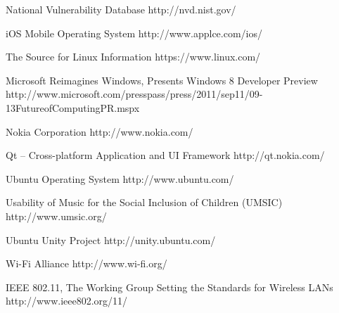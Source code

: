 \begin{thebibliography}{9}
		{National Vulnerability Database}
		{http://nvd.nist.gov/}
	
		{iOS Mobile Operating System}
		{http://www.applce.com/ios/}

		{The Source for Linux Information}
		{https://www.linux.com/}

		{Microsoft Reimagines Windows, Presents Windows 8 Developer Preview}
		{http://www.microsoft.com/presspass/press/2011/sep11/09-13FutureofComputingPR.mspx}

		{Nokia Corporation}
		{http://www.nokia.com/}
		
		{Qt -- Cross-platform Application and UI Framework}
		{http://qt.nokia.com/}
	
		{Ubuntu Operating System}
		{http://www.ubuntu.com/}

		{Usability of Music for the Social Inclusion of Children (UMSIC)}
		{http://www.umsic.org/}
		
		{Ubuntu Unity Project}
		{http://unity.ubuntu.com/}

		{Wi-Fi Alliance}
		{http://www.wi-fi.org/}

		{IEEE 802.11, The Working Group Setting the Standards for Wireless LANs}
		{http://www.ieee802.org/11/}

\end{thebibliography}
